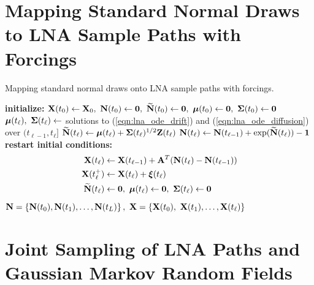 \section{Mapping Standard Normal Draws to LNA Sample Paths with Forcings}
\label{sec:dolna_forcings}
\begin{algorithm}[htbp]
	\caption{Mapping standard normal draws onto LNA sample paths with forcings.}
	\label{alg:doLNA2}
	\begin{algorithmic}[1]
		\State \textbf{initialize: }$ \bX(t_0) \gets \bX_0,\ \bN(t_0) \gets \bs{0},\ \bNtil(t_0) \gets \bs{0},\ \bmu(t_0) \gets \bs{0},\ \bSigma(t_0) \gets \bs{0} $
		\State $ \boldsymbol{\mu}(t_\ell),\ \boldsymbol{\Sigma}(t_\ell) \gets $ solutions to (\ref{eqn:lna_ode_drift}) and (\ref{eqn:lna_ode_diffusion}) over $ (t_{\ell-1}, t_\ell] $
		\State $ \widetilde{\mathbf{N}}(t_\ell)\gets \boldsymbol{\mu}(t_\ell) + \boldsymbol{\Sigma}(t_\ell)^{1/2}\mathbf{Z}(t_\ell) $ 
		\State $ \mathbf{N}(t_\ell)\gets \mathbf{N}(t_{\ell-1}) + \exp(\widetilde{\mathbf{N}}(t_\ell)) - \boldsymbol{1} $
		\State \textbf{restart initial conditions:} 
		  \vspace{-0.15in}\hspace{0.2in} \begin{align*}
			\bX(t_\ell) &\gets \bX(t_{\ell-1}) + \bA^T(\bN(t_\ell)-\bN(t_{\ell-1})) \\
			\bX(t_\ell^+) &\gets \bX(t_\ell) + \bxi(t_\ell)\\
			\bNtil(t_\ell) &\gets \bs{0},\ \bmu(t_\ell)\gets\bs{0},\ \bSigma(t_\ell)\gets\bs{0}
			\end{align*}\vspace{-0.35in}
		\EndFor
		\State \hspace{-0.25in}\Return {}
		\State$\mathbf{N} = \left \lbrace\mathbf{N}(t_0),\mathbf{N}(t_1),\dots,\mathbf{N}(t_L)\right \rbrace,\ \mathbf{X} = \left \lbrace \mathbf{X}(t_0),\ \mathbf{X}(t_1),\dots,\mathbf{X}(t_\ell) \right \rbrace $
		\EndProcedure
	\end{algorithmic}
\end{algorithm}

\newpage
\section{Joint Sampling of LNA Paths and Gaussian Markov Random Fields}
\label{sec:lna_ess_gmrf}

